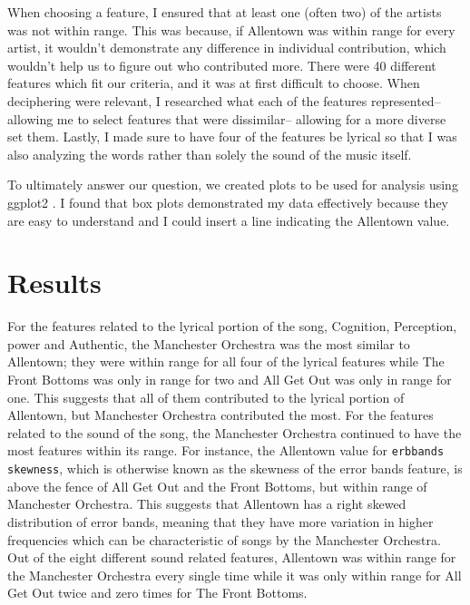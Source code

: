 \documentclass{article}\usepackage[]{graphicx}\usepackage[]{xcolor}
\begin{document}
\begin{multicols}{2}
  When choosing a feature, I ensured that at least one (often two) of the artists was not within range. This was because, if Allentown was within range for every artist, it wouldn't demonstrate any difference in individual contribution, which wouldn't help us to figure out who contributed more. There were 40 different features which fit our criteria, and it was at first difficult to choose. When deciphering were relevant, I researched what each of the features represented-- allowing me to select features that were dissimilar-- allowing for a more diverse set them. Lastly, I made sure to have four of the features be lyrical so that I was also analyzing the words rather than solely the sound of the music itself.
  
  To ultimately answer our question, we created plots to be used for analysis using ggplot2 \citep{ggplot2}. I found that box plots demonstrated my data effectively because they are easy to understand and I could insert a line indicating the Allentown value.
\section{Results}
  For the features related to the lyrical portion of the song, Cognition, Perception, power and Authentic, the Manchester Orchestra was the most similar to Allentown; they were within range for all four of the lyrical features while The Front Bottoms was only in range for two and All Get Out was only in range for one. This suggests that all of them contributed to the lyrical portion of Allentown, but Manchester Orchestra contributed the most. 
    For the features related to the sound of the song, the Manchester Orchestra continued to have the most features within its range. For instance, the Allentown value for \texttt{erbbands skewness}, which is otherwise known as the skewness of the error bands feature, is above the fence of All Get Out and the Front Bottoms, but within range of Manchester Orchestra. This suggests that Allentown has a right skewed distribution of error bands, meaning that they have more variation in higher frequencies which can be characteristic of songs by the Manchester Orchestra. Out of the eight different sound related features, Allentown was within range for the Manchester Orchestra every single time while it was only within range for All Get Out twice and zero times for The Front Bottoms.


\end{multicols}
\end{document}

